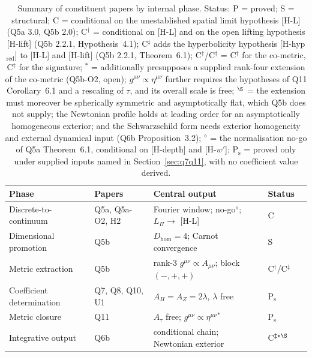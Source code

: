 \documentclass[11pt,a4paper]{article}
\theoremstyle{definition}
\newcommand{\Lpi}{L_\Pi}
\newcommand{\geff}{g^{\mu\nu}}
\newcommand{\Atau}{A_\tau}
\newcommand{\AH}{A_H}
\newcommand{\AZ}{A_Z}
\newcommand{\Dhom}{D_{\mathrm{hom}}}
\begin{document}
      \begin{table}[ht]
        \centering
        \caption{Summary of constituent papers by internal phase.
        Status: P = proved; S = structural; C = conditional on the unestablished spatial
        limit hypothesis [H-L] (Q5a 3.0, Q5b 2.0); C$^{\dagger}$ = conditional on [H-L] and on the
        open lifting hypothesis [H-lift] (Q5b 2.2.1, Hypothesis~4.1); C$^{\ddagger}$ adds the
        hyperbolicity hypothesis [H-hyp$_{\mathrm{red}}$] to [H-L] and [H-lift] (Q5b 2.2.1, Theorem~6.1);
        C$^{\dagger}$/C$^{\ddagger}$ = C$^{\dagger}$ for the co-metric, C$^{\ddagger}$ for the signature;
        $^{\ast}$ = additionally presupposes a supplied rank-four extension of the co-metric
        (Q5b-O2, open); $\geff \propto \eta^{\mu\nu}$ further requires the hypotheses of Q11
        Corollary~6.1 and a rescaling of $\tau$, and its overall scale is free; $^{\S}$ = the extension must
        moreover be spherically symmetric and asymptotically flat, which Q5b does not supply; the Newtonian
        profile holds at leading order for an asymptotically homogeneous exterior; and the Schwarzschild form
        needs exterior homogeneity and external dynamical input (Q6b Proposition~3.2); $^{\diamond}$ = the normalisation
        no-go of Q5a Theorem~6.1, conditional on [H-depth] and [H-$w'$];
        P$_{\mathrm{s}}$ = proved only under supplied inputs named in Section~\ref{sec:q7q11},
        with no coefficient value derived.}
        \label{tab:papers}
        \renewcommand{\arraystretch}{1.2}
        \begin{tabular}{@{}lllll@{}}
          \toprule
          Phase & Papers & Central output & Status \\
          \midrule
          Discrete-to-continuum & Q5a, Q5a-O2, H2 & Fourier window; no-go$^{\diamond}$; $\Lpi \to$ [H-L] & C \\
          Dimensional promotion & Q5b & $\Dhom = 4$; Carnot convergence & S \\
          Metric extraction & Q5b & rank-3 $\geff \propto A_{\mu\nu}$; block $(-, +, +)$ & C$^{\dagger}$/C$^{\ddagger}$ \\
          Coefficient determination & Q7, Q8, Q10, U1 & $\AH = \AZ = 2\lambda$, $\lambda$ free & P$_{\mathrm{s}}$ \\
          Metric closure & Q11 & $\Atau$ free; $\geff \propto \eta^{\mu\nu}$$^{\ast}$ & P$_{\mathrm{s}}$ \\
          Integrative output & Q6b & conditional chain; Newtonian exterior & C$^{\ddagger\ast\S}$ \\
          \bottomrule
        \end{tabular}
      \end{table}
\end{document}
